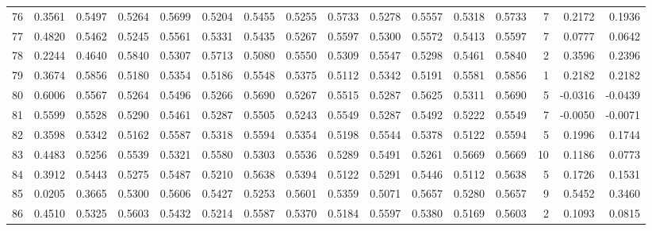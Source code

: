 \begin{tabular}{lrrrrrrrrrrrrrrr}
76  &      0.3561 &  0.5497 &  0.5264 &  0.5699 &  0.5204 &  0.5455 &  0.5255 &  0.5733 &  0.5278 &  0.5557 &   0.5318 &     0.5733 &      7 &                    0.2172 &                     0.1936 \\
77  &      0.4820 &  0.5462 &  0.5245 &  0.5561 &  0.5331 &  0.5435 &  0.5267 &  0.5597 &  0.5300 &  0.5572 &   0.5413 &     0.5597 &      7 &                    0.0777 &                     0.0642 \\
78  &      0.2244 &  0.4640 &  0.5840 &  0.5307 &  0.5713 &  0.5080 &  0.5550 &  0.5309 &  0.5547 &  0.5298 &   0.5461 &     0.5840 &      2 &                    0.3596 &                     0.2396 \\
79  &      0.3674 &  0.5856 &  0.5180 &  0.5354 &  0.5186 &  0.5548 &  0.5375 &  0.5112 &  0.5342 &  0.5191 &   0.5581 &     0.5856 &      1 &                    0.2182 &                     0.2182 \\
80  &      0.6006 &  0.5567 &  0.5264 &  0.5496 &  0.5266 &  0.5690 &  0.5267 &  0.5515 &  0.5287 &  0.5625 &   0.5311 &     0.5690 &      5 &                   -0.0316 &                    -0.0439 \\
81  &      0.5599 &  0.5528 &  0.5290 &  0.5461 &  0.5287 &  0.5505 &  0.5243 &  0.5549 &  0.5287 &  0.5492 &   0.5222 &     0.5549 &      7 &                   -0.0050 &                    -0.0071 \\
82  &      0.3598 &  0.5342 &  0.5162 &  0.5587 &  0.5318 &  0.5594 &  0.5354 &  0.5198 &  0.5544 &  0.5378 &   0.5122 &     0.5594 &      5 &                    0.1996 &                     0.1744 \\
83  &      0.4483 &  0.5256 &  0.5539 &  0.5321 &  0.5580 &  0.5303 &  0.5536 &  0.5289 &  0.5491 &  0.5261 &   0.5669 &     0.5669 &     10 &                    0.1186 &                     0.0773 \\
84  &      0.3912 &  0.5443 &  0.5275 &  0.5487 &  0.5210 &  0.5638 &  0.5394 &  0.5122 &  0.5291 &  0.5446 &   0.5112 &     0.5638 &      5 &                    0.1726 &                     0.1531 \\
85  &      0.0205 &  0.3665 &  0.5300 &  0.5606 &  0.5427 &  0.5253 &  0.5601 &  0.5359 &  0.5071 &  0.5657 &   0.5280 &     0.5657 &      9 &                    0.5452 &                     0.3460 \\
86  &      0.4510 &  0.5325 &  0.5603 &  0.5432 &  0.5214 &  0.5587 &  0.5370 &  0.5184 &  0.5597 &  0.5380 &   0.5169 &     0.5603 &      2 &                    0.1093 &                     0.0815 \\

\end{tabular}
